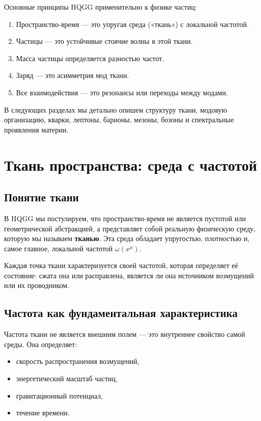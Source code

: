\documentclass[12pt,a4paper]{article}
\begin{document}
Основные принципы HQGG применительно к физике частиц:
\begin{enumerate}
\item Пространство-время — это упругая среда («ткань») с локальной частотой.
\item Частицы — это устойчивые стоячие волны в этой ткани.
\item Масса частицы определяется разностью частот.
\item Заряд — это асимметрия мод ткани.
\item Все взаимодействия — это резонансы или переходы между модами.
\end{enumerate}

В следующих разделах мы детально опишем структуру ткани, модовую организацию, кварки, лептоны, барионы, мезоны, бозоны и спектральные проявления материи.

\section{Ткань пространства: среда с частотой}

\subsection{Понятие ткани}

В HQGG мы постулируем, что пространство-время не является пустотой или геометрической абстракцией, а представляет собой реальную физическую среду, которую мы называем \textbf{тканью}. Эта среда обладает упругостью, плотностью и, самое главное, локальной частотой \(\omega(x^\mu)\).

Каждая точка ткани характеризуется своей частотой, которая определяет её состояние: сжата она или расправлена, является ли она источником возмущений или их проводником.

\subsection{Частота как фундаментальная характеристика}

Частота ткани не является внешним полем — это внутреннее свойство самой среды. Она определяет:
\begin{itemize}
\item скорость распространения возмущений,
\item энергетический масштаб частиц,
\item гравитационный потенциал,
\item течение времени.
\end{itemize}
\end{document}
